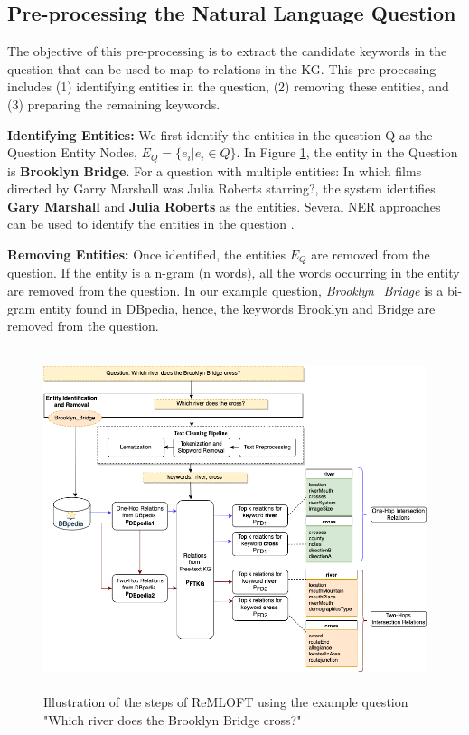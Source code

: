 \begin{sloppypar}
\subsection{Pre-processing the Natural Language Question}
\label{sec:preprocessnlq}
The objective of this pre-processing is to extract the candidate keywords in the question that can be used to map to relations in the KG. This pre-processing includes (1) identifying entities in the question, (2) removing these entities, and (3) preparing the remaining keywords.

\textbf{Identifying Entities:} We first identify the entities in the question Q as the Question Entity Nodes, $E_{Q}=\{e_{i} | e_{i} \in Q \}$.  In Figure \ref{fig:approach}, the entity in the Question is \textbf{Brooklyn Bridge}. For a question with multiple entities: {\selectfont In which films directed by Garry Marshall was Julia Roberts starring?}, the system identifies \textbf{Gary Marshall} and \textbf{Julia Roberts} as the entities. Several NER approaches can be used to identify the entities in the question \cite{falcon, falcon2}. 

\textbf{Removing Entities:} Once identified, the entities $E_{Q}$ are removed from the question. If the entity is a n-gram (n words), all the words occurring in the entity are removed from the question. In our example question, \textit{Brooklyn\_Bridge} is a bi-gram entity found in DBpedia, hence, the keywords Brooklyn and Bridge are removed from the question.

\begin{figure}[h]
    \centering
   \includegraphics[width=15cm, height=10cm]{chapters/figures/Approach.png}
    \caption{Illustration of the steps of ReMLOFT using the example question "Which river does the Brooklyn Bridge cross?"}
    \label{fig:approach}
\end{figure}


\end{sloppypar}
